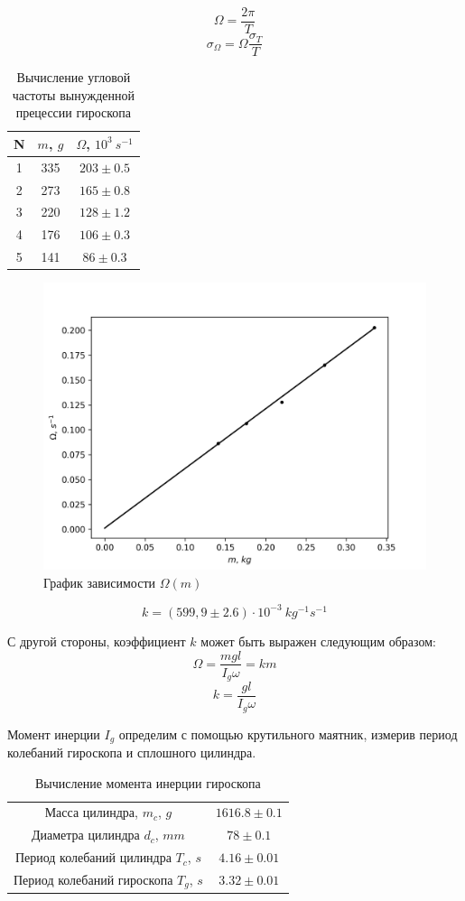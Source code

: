 \documentclass[14pt, a4paper]{article}
\begin{document}
\[\Omega=\frac{2\pi}{T}\]
\[\sigma_{\Omega}=\Omega\frac{\sigma_T}{T}\]

\begin{table}[!h]
\centering
\begin{tabular}{| c | c | c |}
\hline
N & $m$, $g$ & $\Omega$, $10^3\ s^{-1}$ \\
\hline
1 & 335 & $203\pm 0.5$ \\
2 & 273 & $165\pm 0.8$ \\
3 & 220 & $128\pm 1.2$ \\
4 & 176 & $106\pm 0.3$ \\
5 & 141 & $86\pm 0.3$ \\
\hline
\end{tabular}
\label{table2}
\caption{Вычисление угловой частоты вынужденной прецессии гироскопа}
\end{table}

\begin{figure}[!h]
\centering
\includegraphics[scale=0.75]{laba8_1.png}
\caption{График зависимости $\Omega(m)$}
\end{figure}

\[k=(599,9\pm2.6)\cdot10^{-3}\ kg^{-1}s^{-1}\]

С другой стороны, коэффициент $k$ может быть выражен следующим образом:
\[\Omega=\frac{mgl}{I_g\omega}=km\]
\[k=\frac{gl}{I_g\omega}\]

Момент инерции $I_g$ определим с помощью крутильного маятник, измерив период колебаний гироскопа и сплошного цилиндра.

\begin{table}[!h]
\centering
\begin{tabular}{| c | c |}
\hline
Масса цилиндра, $m_c$, $g$ & $1616.8\pm0.1$ \\
Диаметра цилиндра $d_c$, $mm$ & $78\pm0.1$ \\
Период колебаний цилиндра $T_c$, $s$ & $4.16\pm0.01$ \\
Период колебаний гироскопа $T_g$, $s$ & $3.32\pm0.01$ \\
\hline
\end{tabular}
\label{table3}
\caption{Вычисление момента инерции гироскопа}
\end{table}
\end{document}
